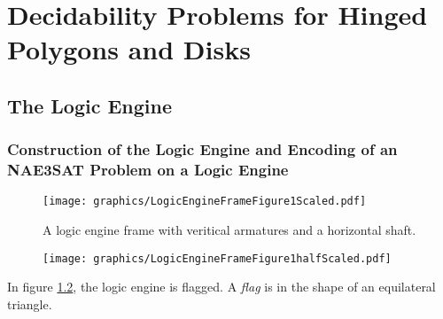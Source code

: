 \chapter{Decidability Problems for Hinged Polygons and Disks}
\section{The Logic Engine}

\subsection{Construction of the Logic Engine and Encoding of an NAE3SAT Problem on a Logic 
Engine}
\begin{figure}[!h]
\begin{center}
\texttt{[image: graphics/LogicEngineFrameFigure1Scaled.pdf]}
\caption{A logic engine frame with veritical armatures and a horizontal 
shaft.}\label{fig:LogicEngineFrameFigure1.pdf}
\end{center}
\end{figure}

% 
\begin{figure}[!h]
\begin{center}
\texttt{[image: graphics/LogicEngineFrameFigure1halfScaled.pdf]}
\caption{}\label{fig:LogicEngineFrameFigure2.pdf-1}
\end{center}
\end{figure}
In figure \ref{fig:LogicEngineFrameFigure2.pdf-1}, the logic engine is flagged.  A \textit{flag} is 
 in the shape of an equilateral triangle.






